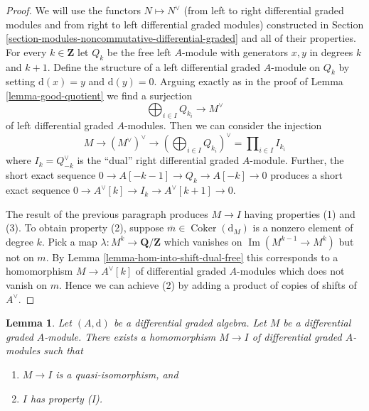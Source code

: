 \documentclass{stacks-project}
\theoremstyle{plain}
\newtheorem{lemma}[subsection]{Lemma}
\theoremstyle{definition}
\theoremstyle{remark}
\numberwithin{equation}{subsection}
\def\Im{\mathop{\mathrm{Im}}}
\def\Coker{\mathop{\mathrm{Coker}}}
\begin{document}
\begin{proof}
We will use the functors $N \mapsto N^\vee$ (from left to right
differential graded modules and from right to left differential
graded modules) constructed in
Section \ref{section-modules-noncommutative-differential-graded}
and all of their properties.
For every $k \in \mathbf{Z}$ let $Q_k$ be the free left $A$-module with
generators $x, y$ in degrees $k$ and $k + 1$. Define the structure of a
left differential graded $A$-module on $Q_k$ by setting $\text{d}(x) = y$
and $\text{d}(y) = 0$. Arguing exactly as in the proof of
Lemma \ref{lemma-good-quotient} we find a surjection
$$
\bigoplus\nolimits_{i \in I} Q_{k_i} \longrightarrow M^\vee
$$
of left differential graded $A$-modules. Then we can consider the injection
$$
M \to (M^\vee)^\vee \to (\bigoplus\nolimits_{i \in I} Q_{k_i})^\vee =
\prod\nolimits_{i \in I} I_{k_i}
$$
where $I_k = Q_{-k}^\vee$ is the ``dual'' right differential graded $A$-module.
Further, the short exact sequence $0 \to A[-k - 1] \to Q_k \to A[-k] \to 0$
produces a short exact sequence
$0 \to A^\vee[k] \to I_k \to A^\vee[k + 1] \to 0$.

\medskip\noindent
The result of the previous paragraph produces $M \to I$
having properties (1) and (3). To obtain property (2), suppose
$\overline{m} \in \Coker(\text{d}_M)$ is a nonzero element of
degree $k$. Pick a map $\lambda : M^k \to \mathbf{Q}/\mathbf{Z}$
which vanishes on $\Im(M^{k - 1} \to M^k)$ but not on $m$. By
Lemma \ref{lemma-hom-into-shift-dual-free}
this corresponds to a homomorphism $M \to A^\vee[k]$ of
differential graded $A$-modules which does not vanish on $m$.
Hence we can achieve (2) by adding
a product of copies of shifts of $A^\vee$.
\end{proof}

\begin{lemma}
\label{lemma-right-resolution}
Let $(A, \text{d})$ be a differential graded algebra.
Let $M$ be a differential graded $A$-module. There exists a homomorphism
$M \to I$ of differential graded $A$-modules such that
\begin{enumerate}
\item $M \to I$ is a quasi-isomorphism, and
\item $I$ has property (I).
\end{enumerate}
\end{lemma}
\end{document}
